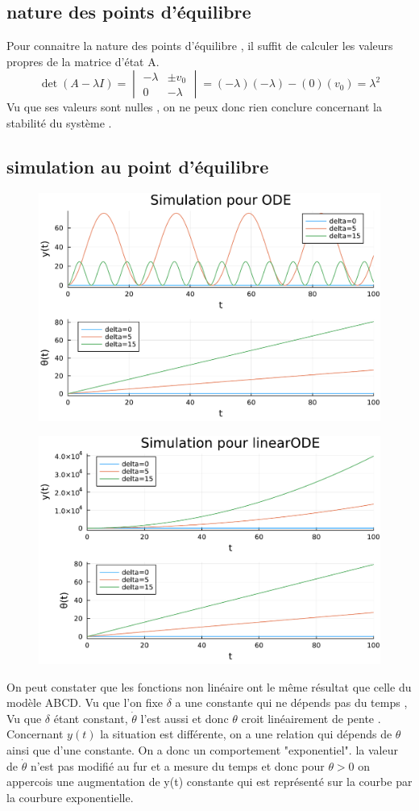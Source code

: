 \documentclass[11pt,a4paper]{article}
\begin{document}
\subsection{nature des points d'équilibre}
Pour connaitre la nature des points d'équilibre , il suffit de calculer les valeurs propres de la matrice d'état A.
$$
\det(A - \lambda I) = 
\begin{vmatrix}
-\lambda &\pm v_0 \\
0 & -\lambda
\end{vmatrix}
= (-\lambda)(-\lambda) - (0)(v_0) = \lambda^2
$$
Vu que ses valeurs sont nulles , on ne peux donc rien conclure concernant la stabilité du système .

\subsection{simulation au point d'équilibre}



\begin{figure}[!h]
	\centering
	\includegraphics[width=0.5\linewidth]{../code/jlplots/Q1_7_ODE.pdf}
\end{figure}
\begin{figure}[!h]
	\centering
	\includegraphics[width=0.5\linewidth]{../code/jlplots/Q1_7_linearODE.pdf}
\end{figure}
On peut constater que les fonctions non linéaire ont le même résultat que celle du modèle ABCD.
Vu que l'on fixe $\delta$ a une constante qui ne dépends pas du temps , 
Vu que $\delta$ étant constant, $\dot \theta$ l'est aussi et donc $\theta$ croit linéairement de pente . \\
Concernant $y(t)$ la situation est différente, on a une relation qui dépends de $\theta$ ainsi que d'une constante. On a donc un comportement "exponentiel".
la valeur de $\dot \theta$ n'est pas modifié au fur et a mesure du temps et donc pour $\theta>0 $ on appercois une augmentation de y(t) constante qui est représenté sur la courbe par la courbure exponentielle.
\end{document}
